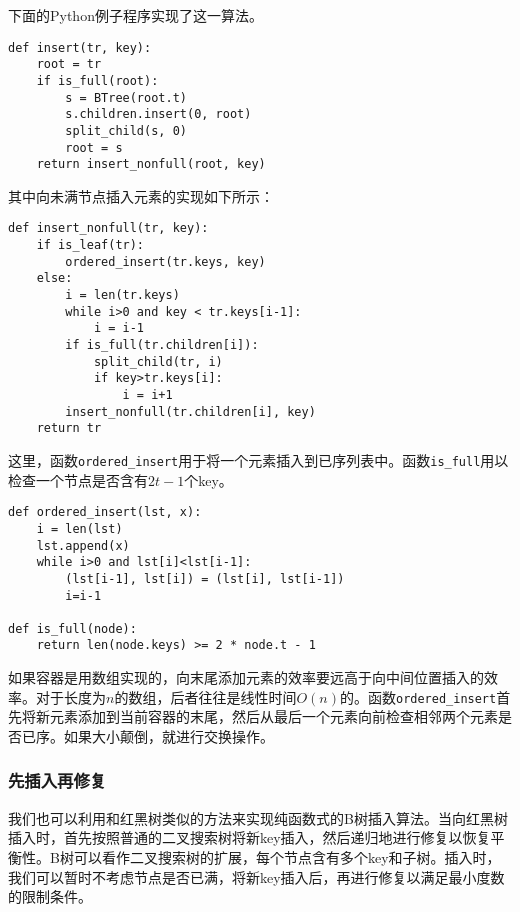 \documentclass{ctexart}
\begin{document}
下面的Python例子程序实现了这一算法。

\lstset{language=Python}
\begin{lstlisting}
def insert(tr, key):
    root = tr
    if is_full(root):
        s = BTree(root.t)
        s.children.insert(0, root)
        split_child(s, 0)
        root = s
    return insert_nonfull(root, key)
\end{lstlisting}

其中向未满节点插入元素的实现如下所示：

\begin{lstlisting}
def insert_nonfull(tr, key):
    if is_leaf(tr):
        ordered_insert(tr.keys, key)
    else:
        i = len(tr.keys)
        while i>0 and key < tr.keys[i-1]:
            i = i-1
        if is_full(tr.children[i]):
            split_child(tr, i)
            if key>tr.keys[i]:
                i = i+1
        insert_nonfull(tr.children[i], key)
    return tr
\end{lstlisting}

这里，函数\texttt{ordered\_insert}用于将一个元素插入到已序列表中。函数\texttt{is\_full}用以检查一个节点是否含有$2t-1$个key。

\begin{lstlisting}
def ordered_insert(lst, x):
    i = len(lst)
    lst.append(x)
    while i>0 and lst[i]<lst[i-1]:
        (lst[i-1], lst[i]) = (lst[i], lst[i-1])
        i=i-1

def is_full(node):
    return len(node.keys) >= 2 * node.t - 1
\end{lstlisting}

如果容器是用数组实现的，向末尾添加元素的效率要远高于向中间位置插入的效率。对于长度为$n$的数组，后者往往是线性时间$O(n)$的。函数\texttt{ordered\_insert}首先将新元素添加到当前容器的末尾，然后从最后一个元素向前检查相邻两个元素是否已序。如果大小颠倒，就进行交换操作。


\subsubsection{先插入再修复}

我们也可以利用和红黑树类似的方法来实现纯函数式的B树插入算法。当向红黑树插入时，首先按照普通的二叉搜索树将新key插入，然后递归地进行修复以恢复平衡性。B树可以看作二叉搜索树的扩展，每个节点含有多个key和子树。插入时，我们可以暂时不考虑节点是否已满，将新key插入后，再进行修复以满足最小度数的限制条件。
\end{document}
